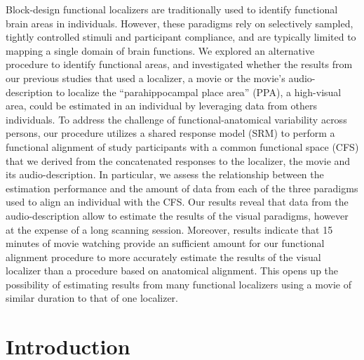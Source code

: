 
\begin{chapterabstract}

    Block-design functional localizers are traditionally used to identify
    functional brain areas in individuals.
However, these paradigms rely on selectively sampled, tightly controlled stimuli
    and participant compliance, and are typically limited to mapping a single
    domain of brain functions.
We explored an alternative procedure to identify functional areas, and
    investigated whether the results from our previous studies that used a
    localizer, a movie or the movie's audio-description to localize the
    ``parahippocampal place area'' (PPA), a high-visual area, could be estimated
    in an individual by leveraging data from others individuals.
To address the challenge of functional-anatomical variability across persons,
    our procedure utilizes a shared response model (SRM) to perform a functional
    alignment of study participants with a common functional space (CFS) that we
    derived from the concatenated responses to the localizer, the movie and its
    audio-description.
In particular, we assess the relationship between the estimation performance and
    the amount of data from each of the three paradigms used to align an
    individual with the CFS.
    Our results reveal that data from the audio-description allow to estimate
    the results of the visual paradigms, however at the expense of a long
    scanning session.
Moreover, results indicate that 15 minutes of movie watching provide an
    sufficient amount for our functional alignment procedure to more accurately
    estimate the results of the visual localizer than a procedure based on
    anatomical alignment.
This opens up the possibility of estimating results from many functional
    localizers using a movie of similar duration to that of one localizer.


\end{chapterabstract}



\pagebreak



\section{Introduction}


